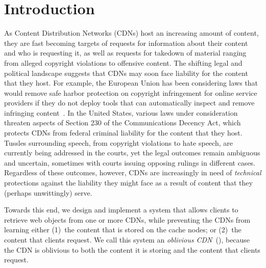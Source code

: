 \section{Introduction}
\label{sec:intro}


As Content Distribution Networks (CDNs) host an increasing amount of content, they are fast becoming targets of requests for information about their content and who is requesting it, as well as requests for takedown of material ranging from alleged copyright violations to offensive content. The shifting legal and political landscape suggests that CDNs may soon face liability for the content that they host. For example, the European Union has been considering laws that would remove safe harbor protection on copyright infringement for online service providers if they do not deploy tools that can automatically inspect and remove infringing content~\cite{eu-copyright}. In the United States, various laws under consideration threaten aspects of Section 230 of the Communications Decency Act, which protects CDNs from federal criminal liability for the content that they host. Tussles surrounding speech, from copyright violations to hate speech, are currently being addressed in the courts, yet the legal outcomes remain ambiguous and uncertain, sometimes with courts issuing opposing rulings in different cases. Regardless of these outcomes, however, CDNs are increasingly in need of {\em technical} protections against the liability they might face as a result of content that they (perhaps unwittingly) serve.

Towards this end, we design and implement a system that allows clients to
retrieve web objects from one or more CDNs, while preventing the CDNs from
learning either (1)~the content that is stored on the cache nodes; or (2)~the content that clients request. We call this system an {\em oblivious
CDN}~(\system{}), because the CDN is oblivious to both the content it is
storing and the content that clients request.

